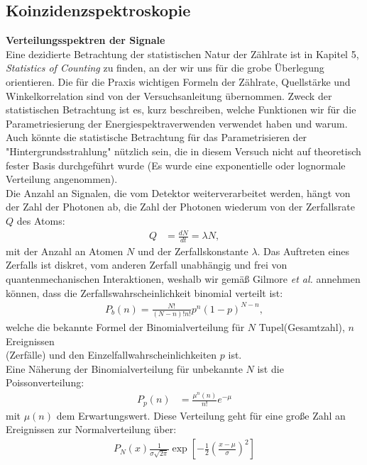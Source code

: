 \documentclass[%
aps,
onecolumn,
11pt,
tightenlines,
nofootinbib,
superscriptaddress,
floatfix,
prd,
]{revtex4-2}
\begin{document}
\subsection{Koinzidenzspektroskopie}
\label{sec:Koinzidenzspektroskopie}
\noindent \textbf{Verteilungsspektren der Signale}\\
Eine dezidierte Betrachtung der statistischen Natur der Zählrate ist in \cite{gilmore2008practical} Kapitel 5, \textit{Statistics of Counting} zu finden, an der wir uns für die grobe Überlegung orientieren. Die für die Praxis wichtigen Formeln der Zählrate, Quellstärke und Winkelkorrelation sind von der Versuchsanleitung \cite{manual1} übernommen. Zweck der statistischen Betrachtung ist es, kurz beschreiben, welche Funktionen wir für die Parametriesierung der Energiespektraverwenden verwendet haben und warum. Auch könnte die statistische Betrachtung für das Parametrisieren der "Hintergrundsstrahlung" nützlich sein, die in diesem Versuch nicht auf theoretisch fester Basis durchgeführt wurde (Es wurde eine exponentielle oder lognormale Verteilung angenommen).\\
Die Anzahl an Signalen, die vom Detektor weiterverarbeitet werden, hängt von der Zahl der Photonen ab, die Zahl der Photonen wiederum von der Zerfallsrate $Q$ des Atoms:
\begin{align}
	Q &= \frac{dN}{dt} = \lambda N, 
\end{align}
mit der Anzahl an Atomen $N$ und der Zerfallskonstante $\lambda$. Das Auftreten eines Zerfalls ist diskret, vom anderen Zerfall unabhängig und frei von quantenmechanischen Interaktionen, weshalb wir gemäß Gilmore \textit{et al.} annehmen können, dass die Zerfallswahrscheinlichkeit binomial verteilt ist:
\begin{align}
	P_b(n) = \frac{N!}{(N - n)!n!}p^n(1-p)^{N-n},
\end{align}
welche die bekannte Formel der Binomialverteilung für $N$ Tupel(Gesamtzahl), $n$ Ereignissen \\(Zerfälle) und den Einzelfallwahrscheinlichkeiten $p$ ist. \\
Eine Näherung der Binomialverteilung für unbekannte $N$ ist die Poissonverteilung:
\begin{align}
	P_p(n) &= \frac{\mu^n(n)}{n!}e^{-\mu}
\end{align}
mit $\mu(n)$ dem Erwartungswert. Diese Verteilung geht für eine große Zahl an Ereignissen zur Normalverteilung über:
\begin{align}
	\label{eq:gaussian}
	P_N(x)\frac{1}{\sigma \sqrt{2\pi}} \exp \left[ -\frac{1}{2} \left( \frac{x-\mu}{\sigma} \right)^2 \right ]
\end{align}
\end{document}

